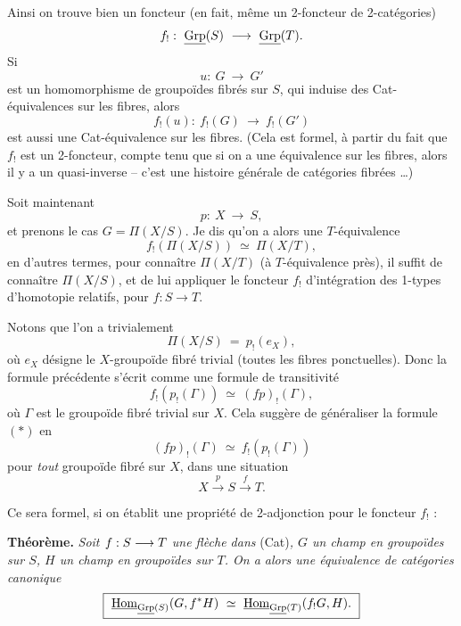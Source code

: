 \clearpage



Ainsi on trouve bien un foncteur (en fait, même un 2-foncteur de 2-catégories)
\[ f_! :\ \Grp(S) \ \longrightarrow\ \Grp(T). \]
Si
\[ u :\ G \ \longrightarrow\ G' \]
est un homomorphisme de groupoïdes fibrés sur $S$, qui induise des Cat-équivalences sur les fibres, alors
\[ f_!(u) :\ f_!(G) \ \longrightarrow\ f_!(G') \]
est aussi une Cat-équivalence sur les fibres. (Cela est formel, à partir du fait que $f_!$ est un 2-foncteur, compte tenu que si on a une équivalence sur les fibres, alors il y a un quasi-inverse -- c'est une histoire générale de catégories fibrées \dots)

Soit maintenant
\[ p :\ X \ \longrightarrow\ S, \]
et prenons le cas $G = \Pi(X/S)$. Je dis qu'on a alors une $T$-équivalence
\[ \boxed{\ f_!(\Pi(X/S)) \ \simeq\ \Pi(X/T),\ } \tag*{$(*)$} \]
en d'autres termes, pour connaître $\Pi(X/T)$ (à $T$-équivalence près), il suffit de connaître $\Pi(X/S)$, et de lui appliquer le foncteur $f_!$ d'intégration des 1-types d'homotopie relatifs, pour $f : S \longrightarrow T$.

Notons que l'on a trivialement
\[ \Pi(X/S) \ =\ p_!(e_X), \]
où $e_X$ désigne le $X$-groupoïde fibré trivial (toutes les fibres ponctuelles). Donc la formule précédente s'écrit comme une formule de transitivité
\[ f_!(p_!(\Gamma)) \ \simeq\ (fp)_!(\Gamma), \]
où $\Gamma$ est le groupoïde fibré trivial sur $X$. Cela suggère de généraliser la formule $(*)$ en
\[ \boxed{\ (fp)_!(\Gamma) \ \simeq\ f_!(p_!(\Gamma))\ } \]
pour \textit{tout} groupoïde fibré sur $X$, dans une situation
\[ X \xrightarrow{\ p\ } S \xrightarrow{\ f\ } T. \]

Ce sera formel, si on établit une propriété de 2-adjonction pour le foncteur $f_!$ :


\textbf{Théorème.} \textit{Soit $f : S \longrightarrow T$ une flèche dans} (Cat)\textit{, $G$ un champ en groupoïdes sur $S$, $H$ un champ en groupoïdes sur $T$. On a alors une équivalence de catégories canonique}
\[
\boxed{\ \uHom_{\uGrp(S)}(G, f^*H) \ \simeq\ \uHom_{\uGrp(T)}(f_!G, H).\ }
\]

